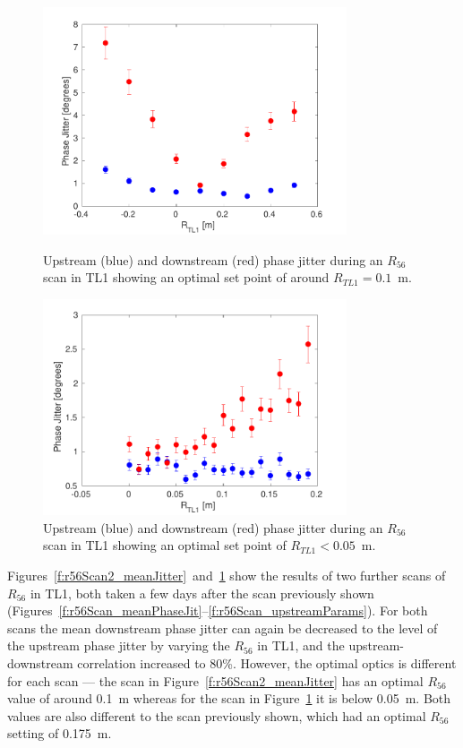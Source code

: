 \begin{figure}
  \centering
  \includegraphics[width=0.8\textwidth]{Figures/propagation/r56Scan2_meanJitter}
  \caption{Upstream (blue) and downstream (red) phase jitter during an \(R_{56}\) scan in TL1 showing an optimal set point of around \(R_{TL1}=0.1\)~m.}
  \label{f:r56Scan2_meanJitter}
  \includegraphics[width=0.8\textwidth]{Figures/propagation/r56Scan3_meanJitter}
  \caption{Upstream (blue) and downstream (red) phase jitter during an \(R_{56}\) scan in TL1 showing an optimal set point of \(R_{TL1}<0.05\)~m.}
  \label{f:r56Scan3_meanJitter}
\end{figure}


Figures~\ref{f:r56Scan2_meanJitter}~and~\ref{f:r56Scan3_meanJitter} show the results of two further scans of \(R_{56}\) in TL1, both taken a few days after the scan previously shown (Figures~\ref{f:r56Scan_meanPhaseJit}--\ref{f:r56Scan_upstreamParams}). For both scans the mean downstream phase jitter can again be decreased to the level of the upstream phase jitter by varying the \(R_{56}\) in TL1, and the upstream-downstream correlation increased to 80\%. However, the optimal optics is different for each scan --- the scan in Figure~\ref{f:r56Scan2_meanJitter} has an optimal \(R_{56}\) value of around 0.1~m whereas for the scan in Figure~\ref{f:r56Scan3_meanJitter} it is below 0.05~m. Both values are also different to the scan previously shown, which had an optimal \(R_{56}\) setting of 0.175~m.

